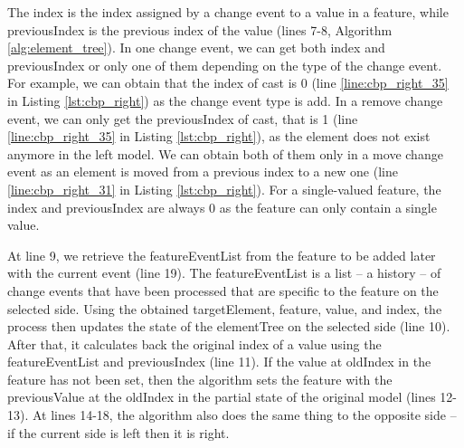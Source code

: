 The \textsf{index} is the index assigned by a change event to a value in a feature, while \textsf{previousIndex} is the previous index of the value (lines 7-8, Algorithm \ref{alg:element_tree}). In one change event, we can get both \textsf{index} and \textsf{previousIndex} or only one of them depending on the type of the change event. For example, we can obtain that the \textsf{index} of \textsf{cast} is 0 (line \ref{line:cbp_right_35} in Listing \ref{lst:cbp_right}) as the change event type is \textsf{add}. In a \textsf{remove} change event, we can only get the \textsf{previousIndex} of \textsf{cast}, that is 1 (line \ref{line:cbp_right_35} in Listing \ref{lst:cbp_right}), as the element does not exist anymore in the left model. We can obtain both of them only in a \textsf{move} change event as an element is moved from a previous index to a new one (line \ref{line:cbp_right_31} in Listing \ref{lst:cbp_right}). For a single-valued feature, the \textsf{index} and \textsf{previousIndex} are always 0 as the feature can only contain a single value. 

At line 9, we retrieve the \textsf{featureEventList} from the \textsf{feature} to be added later with the current \textsf{event} (line 19). The \textsf{featureEventList} is a list -- a history -- of change events that have been processed that are specific to the \textsf{feature} on the selected \textsf{side}. Using the obtained \textsf{targetElement}, \textsf{feature}, \textsf{value}, and \textsf{index}, the process then updates the state of the \textsf{elementTree} on the selected \textsf{side} (line 10). After that, it calculates back the original index of a value using the \textsf{featureEventList} and \textsf{previousIndex} (line 11). If the value at \textsf{oldIndex} in the \textsf{feature} has not been set, then the algorithm sets the \textsf{feature} with the \textsf{previousValue} at the \textsf{oldIndex} in the partial state of the original model (lines 12-13). At lines 14-18, the algorithm also does the same thing to the opposite side -- if the current \textsf{side} is \textsf{left} then it is \textsf{right}. 

